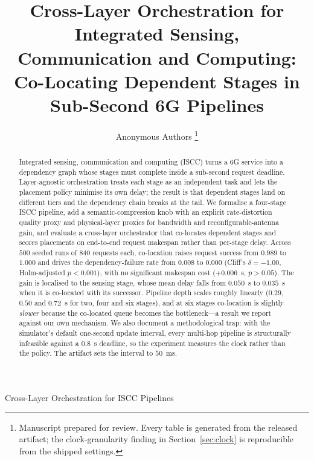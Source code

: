 \documentclass[journal,10pt]{IEEEtran}
\begin{document}
\title{Cross-Layer Orchestration for Integrated Sensing, Communication and
Computing: Co-Locating Dependent Stages in Sub-Second 6G Pipelines}

\author{Anonymous Authors%
\thanks{Manuscript prepared for review. Every table is generated from the
released artifact; the clock-granularity finding in Section~\ref{sec:clock} is
reproducible from the shipped settings.}}

%
{Cross-Layer Orchestration for ISCC Pipelines}

\maketitle

\begin{abstract}
Integrated sensing, communication and computing (ISCC) turns a 6G service into
a dependency graph whose stages must complete inside a sub-second request
deadline. Layer-agnostic orchestration treats each stage as an independent task
and lets the placement policy minimise its own delay; the result is that
dependent stages land on different tiers and the dependency chain breaks at the
tail. We formalise a four-stage ISCC pipeline, add a semantic-compression knob
with an explicit rate-distortion quality proxy and physical-layer proxies for
bandwidth and reconfigurable-antenna gain, and evaluate a cross-layer
orchestrator that co-locates dependent stages and scores placements on
end-to-end request makespan rather than per-stage delay. Across $500$ seeded
runs of $840$ requests each, co-location raises request success from $0.989$
to $1.000$ and drives the dependency-failure rate from $0.008$ to $0.000$
(Cliff's $\delta=-1.00$, Holm-adjusted $p<0.001$), with no significant makespan
cost ($+0.006$~s, $p>0.05$). The gain is localised to the sensing stage, whose
mean delay falls from $0.050$~s to $0.035$~s when it is co-located with its
successor. Pipeline depth scales roughly linearly ($0.29$, $0.50$ and
$0.72$~s for two, four and six stages), and at six stages co-location is
slightly \emph{slower} because the co-located queue becomes the bottleneck---a
result we report against our own mechanism. We also document a methodological
trap: with the simulator's default one-second update interval, every multi-hop
pipeline is structurally infeasible against a $0.8$~s deadline, so the
experiment measures the clock rather than the policy. The artifact sets the
interval to $50$~ms.
\end{abstract}
\end{document}
